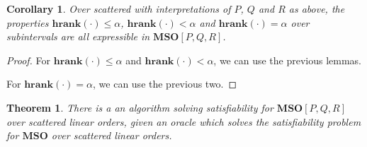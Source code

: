 \documentclass{article}
\newtheorem{theorem}{Theorem}
\newtheorem{corollary}{Corollary}
\newcommand{\hrank}[1]{\mathbf{hrank}\left( #1 \right)}
\newcommand{\mso}{\mathbf{MSO}}
\begin{document}
\begin{corollary}
  Over scattered with interpretations of $P$, $Q$ and $R$ as above, the properties
  $\hrank{\cdot} \le \alpha$, $\hrank{\cdot} < \alpha$ and $\hrank{\cdot} = \alpha$
  over subintervals are all expressible in $\mso[P, Q, R]$.
\end{corollary}

\begin{proof}
  For $\hrank{\cdot} \le \alpha$ and $\hrank{\cdot} < \alpha$, we can use the previous lemmas.

  For $\hrank{\cdot} = \alpha$, we can use the previous two.
\end{proof}

\begin{theorem}
  There is a an algorithm solving satisfiability for $\mso[P, Q, R]$ over scattered linear orders,
  given an oracle which solves the satisfiability problem for $\mso$ over scattered linear orders.
\end{theorem}
\end{document}
